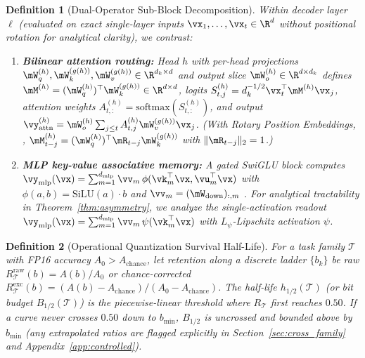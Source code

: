 \documentclass[10pt]{article} %
\newtheorem{definition}{Definition}
\begin{document}
\begin{definition}[Dual-Operator Sub-Block Decomposition]
\label{def:dual}
Within decoder layer $\ell$ (evaluated on exact single-layer inputs $\vx_1,\dots,\vx_t \in \R^d$ without positional rotation for analytical clarity), we contrast:
\begin{enumerate}[leftmargin=*,nosep]
    \item \textbf{Bilinear attention routing:} Head $h$ with per-head projections $\mW_q^{(h)}, \mW_k^{(g(h))}, \mW_v^{(g(h))} \in \R^{d_k \times d}$ and output slice $\mW_o^{(h)} \in \R^{d \times d_k}$ defines $\mM^{(h)} = (\mW_q^{(h)})^\top \mW_k^{(g(h))} \in \R^{d \times d}$, logits $S_{t,j}^{(h)} = d_k^{-1/2} \vx_t^\top \mM^{(h)} \vx_j$, attention weights $A_{t,:}^{(h)} = \mathrm{softmax}(S_{t,:}^{(h)})$, and output $\vy_{\text{attn}}^{(h)} = \mW_o^{(h)} \sum_{j \le t} A_{t,j}^{(h)} \mW_v^{(g(h))} \vx_j$. (With Rotary Position Embeddings, \citealp{su2024roformer}, $\mM_{t-j}^{(h)} = (\mW_q^{(h)})^\top \mR_{t-j} \mW_k^{(g(h))}$ with $\|\mR_{t-j}\|_2 = 1$.)
    \item \textbf{MLP key-value associative memory:} A gated SwiGLU block computes $\vy_{\text{mlp}}(\vx) = \sum_{m=1}^{d_{\text{mlp}}} \vv_m\,\phi(\vk_m^\top \vx, \vu_m^\top \vx)$ with $\phi(a, b) = \mathrm{SiLU}(a)\cdot b$ and $\vv_m = (\mW_{\text{down}})_{:,m}$ \citep{geva2021transformer}. For analytical tractability in Theorem~\ref{thm:asymmetry}, we analyze the single-activation readout $\vy_{\text{mlp}}(\vx) = \sum_{m=1}^{d_{\text{mlp}}} \vv_m\,\psi(\vk_m^\top \vx)$ with $L_\psi$-Lipschitz activation $\psi$.
\end{enumerate}
\end{definition}

\begin{definition}[Operational Quantization Survival Half-Life]
\label{def:halflife}
For a task family $\mathcal{T}$ with FP16 accuracy $A_0 > A_{\text{chance}}$, let retention along a discrete ladder $\{b_k\}$ be raw $R_{\mathcal{T}}^{\text{raw}}(b) = A(b)/A_0$ or chance-corrected $R_{\mathcal{T}}^{\text{exc}}(b) = (A(b) - A_{\text{chance}})/(A_0 - A_{\text{chance}})$. The half-life $h_{1/2}(\mathcal{T})$ (or bit budget $B_{1/2}(\mathcal{T})$) is the piecewise-linear threshold where $R_{\mathcal{T}}$ first reaches $0.50$. If a curve never crosses $0.50$ down to $b_{\min}$, $B_{1/2}$ is uncrossed and bounded above by $b_{\min}$ (any extrapolated ratios are flagged explicitly in Section~\ref{sec:cross_family} and Appendix~\ref{app:controlled}).
\end{definition}
\end{document}
